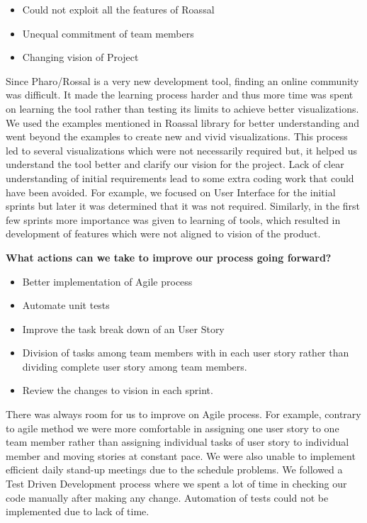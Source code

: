 \documentclass[11pt]{article}
\begin{document}
\begin{itemize}
\item Could not exploit all the features of Roassal
\item Unequal commitment of team members
\item Changing vision of Project
\end{itemize}

Since Pharo/Rossal is a very new development tool, finding an online community was difficult. It made the learning process harder and thus more time was spent on learning the tool rather than testing its limits to achieve better visualizations. We used the examples mentioned in Roassal library for better understanding and went beyond the examples to create new and vivid visualizations. This process led to several visualizations which were not necessarily required but, it helped us understand the tool better and clarify our vision for the project. Lack of clear understanding of initial requirements lead to some extra coding work that could have been avoided. For example, we focused on User Interface for the initial sprints but later it was determined that it was not required. Similarly, in the first few sprints more importance was given to learning of tools, which resulted in development of features which were not aligned to vision of the product.

\textbf{What actions can we take to improve our process going forward?} 

\begin{itemize}
\item Better implementation of Agile process 
\item Automate unit tests
\item Improve the task break down of an User Story
\item Division of tasks among team members with in each user story rather than dividing complete user story among team members.
\item Review the changes to vision in each sprint.
\end{itemize}

There was always room for us to improve on Agile process. For example, contrary to agile method we were more comfortable in assigning one user story to one team member rather than assigning individual tasks of user story to individual member and moving stories at constant pace. We were also unable to implement efficient daily stand-up meetings due to the schedule problems. We followed a Test Driven Development process where we spent a lot of time in checking our code manually after making any change. Automation of tests could not be implemented due to lack of time. 
\end{document}
